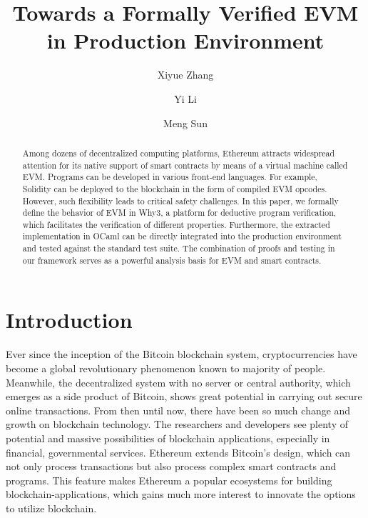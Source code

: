 \documentclass[runningheads]{llncs}
\begin{document}
%
\title{Towards a Formally Verified EVM in Production Environment}

%
%
\author{Xiyue Zhang \and
Yi Li \and
Meng Sun
}
%
%
%
\maketitle              %
%
\begin{abstract}
Among dozens of decentralized computing platforms, Ethe\-reum attracts widespread attention for its native support of smart contracts by means of a virtual machine called EVM. Programs can be developed in various front-end languages. For example, Solidity can be deployed to the blockchain in the form of compiled EVM opcodes. However, such flexibility leads to critical safety challenges. In this paper, we formally define the behavior of EVM in Why3, a platform for deductive program verification, which facilitates the verification of different properties. Furthermore, the extracted implementation in OCaml can be directly integrated into the production environment and tested against the standard test suite. The combination of proofs and testing in our framework serves as a powerful analysis basis for EVM and smart contracts.

\end{abstract}
%
%
%
\section{Introduction}
Ever since the inception of the Bitcoin \cite{nakamoto2008bitcoin} blockchain system, cryptocurrencies have become a global revolutionary phenomenon known to majority of people. Meanwhile, the decentralized system with no server or central authority, which emerges as a side product of Bitcoin, shows great potential in carrying out secure online transactions. From then until now, there have been so much change and growth on blockchain technology. The researchers and developers see plenty of potential and massive possibilities of blockchain applications, especially in financial, governmental services. Ethereum\cite{Ethereum} extends Bitcoin's design, which can not only process transactions but also process complex smart contracts and programs. This feature makes Ethereum a popular ecosystems for building blockchain-applications, which gains much more interest to innovate the options to utilize blockchain.
\end{document}
